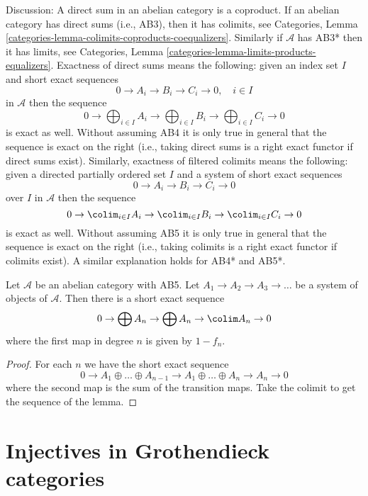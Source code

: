 \noindent
Discussion: A direct sum in an abelian category is a coproduct.
If an abelian category has direct sums (i.e., AB3), then it has colimits, see
Categories, Lemma \ref{categories-lemma-colimits-coproducts-coequalizers}. 
Similarly if $\mathcal{A}$ has AB3* then it has limits, see
Categories, Lemma \ref{categories-lemma-limits-products-equalizers}. 
Exactness of direct sums means the following: given an index set $I$
and short exact sequences
$$
0 \to A_i \to B_i \to C_i \to 0,\quad i \in I
$$
in $\mathcal{A}$ then the sequence
$$
0 \to
\bigoplus\nolimits_{i \in I} A_i \to
\bigoplus\nolimits_{i \in I} B_i \to
\bigoplus\nolimits_{i \in I} C_i \to 0
$$
is exact as well. Without assuming AB4 it is only true in general that
the sequence is exact on the right (i.e., taking direct sums is a right
exact functor if direct sums exist). Similarly, exactness of filtered
colimits means the following: given a directed partially ordered set $I$
and a system of short exact sequences
$$
0 \to A_i \to B_i \to C_i \to 0
$$
over $I$ in $\mathcal{A}$ then the sequence
$$
0 \to
\colim_{i \in I} A_i \to
\colim_{i \in I} B_i \to
\colim_{i \in I} C_i \to 0
$$
is exact as well. Without assuming AB5 it is only true in general that
the sequence is exact on the right (i.e., taking colimits is a right
exact functor if colimits exist). A similar explanation holds for
AB4* and AB5*.

\begin{lemma}
\label{lemma-compute-colimit}
Let $\mathcal{A}$ be an abelian category with AB5.
Let $A_1 \to A_2 \to A_3 \to \ldots$ be a system of objects of $\mathcal{A}$.
Then there is a short exact sequence
$$
0 \to \bigoplus A_n \to \bigoplus A_n \to \colim A_n \to 0
$$
where the first map in degree $n$ is given by $1 - f_n$.
\end{lemma}

\begin{proof}
For each $n$ we have the short exact sequence
$$
0 \to
A_1 \oplus \ldots \oplus A_{n - 1} \to
A_1 \oplus \ldots \oplus A_n \to A_n \to 0
$$
where the second map is the sum of the transition maps.
Take the colimit to get the sequence of the lemma.
\end{proof}



\section{Injectives in Grothendieck categories}
\label{section-grothendieck-categories}


